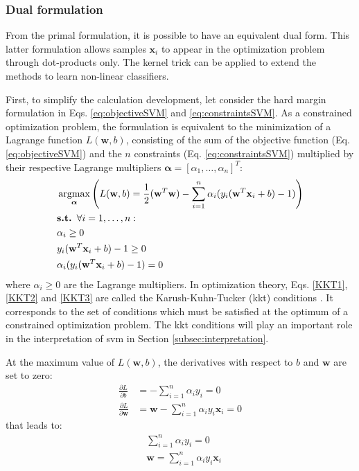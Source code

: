 \subsubsection{Dual formulation}
\label{sec:dualSVM}
From the primal formulation, it is possible to have an equivalent dual form. This latter formulation allows samples $\textbf{x}_i$ to appear in the optimization problem through dot-products only. The kernel trick can be applied to extend the methods to learn non-linear classifiers.

First, to simplify the calculation development, let consider the hard margin formulation in Eqs. \ref{eq:objectiveSVM} and \ref{eq:constraintsSVM}. As a constrained optimization problem, the formulation is equivalent to the minimization of a Lagrange function $L(\textbf{w},b)$, consisting of the sum of the objective function (Eq. \ref{eq:objectiveSVM}) and the $n$ constraints (Eq. \ref{eq:constraintsSVM}) multiplied by their respective Lagrange multipliers $\boldsymbol{\alpha} = [\alpha_1, \ldots, \alpha_n]^T$: 
\begin{align}
	& \argmax_{\boldsymbol{\alpha}} \left( L(\textbf{w},b) = \frac{1}{2}(\textbf{w}^T\textbf{w})-\sum\limits_{i=1}^{n}\alpha_i(y_i(\textbf{w}^T\textbf{x}_i+b)-1) \right) \label{eq:Lagrange} \\
	& \textbf{s.t. } \forall i = 1,\ldots,n: \nonumber \\
	& \alpha_i \geq 0 \label{KKT1}\\
	& y_i(\textbf{w}^T\textbf{x}_i+b)-1 \geq 0 \label{KKT2}\\
	& \alpha_i (y_i(\textbf{w}^T\textbf{x}_i+b)-1) = 0 \label{KKT3}
\end{align}
\noindent where $\alpha_i \geq 0$ are the Lagrange multipliers. In optimization theory, Eqs. \ref{KKT1}, \ref{KKT2} and \ref{KKT3} are called the Karush-Kuhn-Tucker ({\sc kkt}) conditions \cite{Bishop2006}. It corresponds to the set of conditions which must be satisfied at the optimum of a constrained optimization problem. The {\sc kkt} conditions will play an important role in the interpretation of {\sc svm} in Section \ref{subsec:interpretation}. 

\noindent At the maximum value of $L(\textbf{w},b)$, the derivatives with respect to $b$ and $\textbf{w}$ are set to zero:
\begin{align*}
\frac{\partial L}{\partial b} &= - \sum\limits_{i=1}^{n}\alpha_i y_i = 0 \\
\frac{\partial L}{\partial \textbf{w}} &= \textbf{w}-\sum\limits_{i=1}^{n}\alpha_i y_i \textbf{x}_i = 0
\end{align*}
\noindent that leads to:
\begin{align}
&\sum\limits_{i=1}^{n}\alpha_i y_i = 0 \\
& \textbf{w} = \sum\limits_{i=1}^{n}\alpha_i y_i \textbf{x}_i
\end{align}

